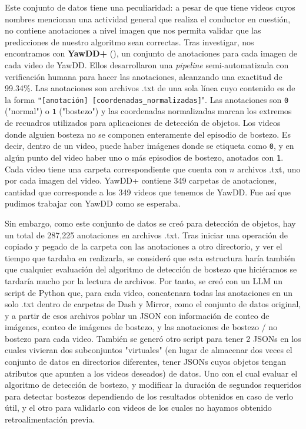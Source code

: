 Este conjunto de datos tiene una peculiaridad: a pesar de que tiene videos cuyos nombres mencionan una actividad general que realiza el conductor en cuestión, no contiene anotaciones a nivel imagen que nos permita validar que las predicciones de nuestro algoritmo sean correctas. Tras investigar, nos encontramos con \textbf{YawDD+} (\cite{YawDDPlus}), un conjunto de anotaciones para cada imagen de cada video de YawDD. Ellos desarrollaron una \textit{pipeline} semi-automatizada con verificación humana para hacer las anotaciones, alcanzando una exactitud de 99.34\%. Las anotaciones son archivos .txt de una sola línea cuyo contenido es de la forma \verb|"[anotación] [coordenadas_normalizadas]|". Las anotaciones son \verb|0| ("normal") o \verb|1| ("bostezo") y las coordenadas normalizadas marcan los extremos de recuadros utilizados para aplicaciones de detección de objetos. Los videos donde alguien bosteza no se componen enteramente del episodio de bostezo. Es decir, dentro de un video, puede haber imágenes donde se etiqueta como \verb|0|, y en algún punto del video haber uno o más episodios de bostezo, anotados con \verb|1|. Cada video tiene una carpeta correspondiente que cuenta con $n$ archivos .txt, uno por cada imagen del video. YawDD+ contiene 349 carpetas de anotaciones, cantidad que corresponde a los 349 videos que tenemos de YawDD. Fue así que pudimos trabajar con YawDD como se esperaba. 

Sin embargo, como este conjunto de datos se creó para detección de objetos, hay un total de 287,225 anotaciones en archivos .txt. Tras iniciar una operación de copiado y pegado de la carpeta con las anotaciones a otro directorio, y ver el tiempo que tardaba en realizarla, se consideró que esta estructura haría también que cualquier evaluación del algoritmo de detección de bostezo que hiciéramos se tardaría mucho por la lectura de archivos. Por tanto, se creó con un LLM un script de Python que, para cada video, concatenara todas las anotaciones en un solo .txt dentro de carpetas de Dash y Mirror, como el conjunto de datos original, y a partir de esos archivos poblar un JSON con información de conteo de imágenes, conteo de imágenes de bostezo, y las anotaciones de bostezo / no bostezo para cada video. También se generó otro script para tener 2 JSONs en los cuales vivieran dos subconjuntos "virtuales" (en lugar de almacenar dos veces el conjunto de datos en directorios diferentes, tener JSONs cuyos objetos tengan atributos que apunten a los videos deseados) de datos. Uno con el cual evaluar el algoritmo de detección de bostezo, y modificar la duración de segundos requeridos para detectar bostezos dependiendo de los resultados obtenidos en caso de verlo útil, y el otro para validarlo con videos de los cuales no hayamos obtenido retroalimentación previa.

